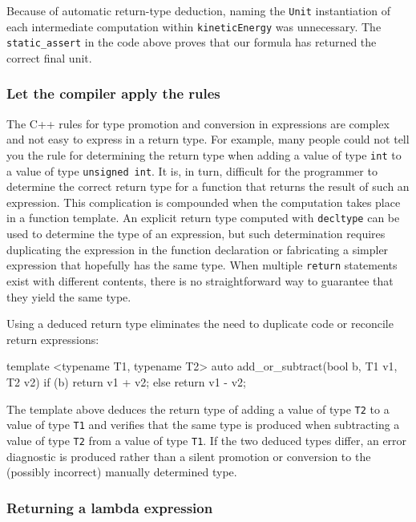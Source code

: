 \noindent Because of automatic return-type deduction, naming the \lstinline!Unit!
instantiation of each intermediate computation within
\lstinline!kineticEnergy! was unnecessary. The \lstinline!static_assert! in
the code above proves that our formula has returned the correct final
unit.

\subsubsection[Let the compiler apply the rules]{Let the compiler apply the rules}\label{let-the-compiler-apply-the-rules}

The C++ rules for type promotion and conversion in expressions are
complex and not easy to express in a return type. For example, many
people could not tell you the rule for determining the return type when
adding a value of type \lstinline!int! to a value of type
\lstinline!unsigned!~\lstinline!int!. It is, in turn, difficult for the
programmer to determine the correct return type for a function that
returns the result of such an expression. This complication is
compounded when the computation takes place in a function template. An
explicit return type computed with \lstinline!decltype! can be used to
determine the type of an expression, but such determination requires
duplicating the expression in the function declaration or fabricating a
simpler expression that hopefully has the same type. When multiple
\lstinline!return! statements exist with different contents, there is no
straightforward way to guarantee that they yield the same type.

Using a deduced return type eliminates the need to duplicate code or
reconcile return expressions:

\begin{emcppslisting}
template <typename T1, typename T2>
auto add_or_subtract(bool b, T1 v1, T2 v2)
{
    if (b) { return v1 + v2; }
    else   { return v1 - v2; }
}
\end{emcppslisting}
    

\noindent The template above deduces the return type of adding a value of type
\lstinline!T2! to a value of type \lstinline!T1! and verifies that the same
type is produced when subtracting a value of type \lstinline!T2! from a
value of type \lstinline!T1!. If the two deduced types differ, an error
diagnostic is produced rather than a silent promotion or conversion to
the (possibly incorrect) manually determined type.

\subsubsection[Returning a lambda expression]{Returning a lambda expression}\label{returning-a-lambda-expression}

